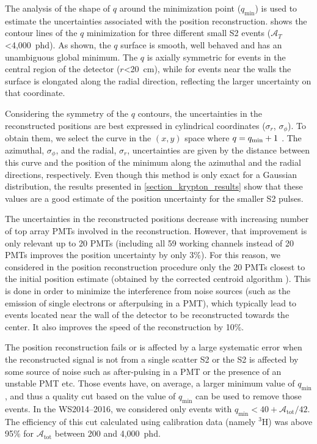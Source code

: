 \documentclass[a4paper,11pt]{article}
\begin{document}
The analysis of the shape of $q$ around the minimization point (${q}_{\mathrm{min}}$) is used to estimate the uncertainties associated with the position reconstruction.  shows the contour lines of the $q$ minimization for three different small S2 events ($\mathcal{A}_T$<4,000~phd). As shown, the $q$ surface is smooth, well behaved and has an unambiguous global minimum. The $q$ is axially symmetric for events in the central region of the detector ($r$<20~cm), while for events near the walls the surface is elongated along the radial direction, reflecting the larger uncertainty on that coordinate.

Considering the symmetry of the $q$ contours, the  uncertainties in the reconstructed positions are best expressed in cylindrical coordinates ($\sigma_r$, $\sigma_\phi$). To obtain them, we select the curve in the $(x, y)$ space where  $q = q_{\rm min} + 1$ \cite{PDG2014}. The azimuthal, $\sigma_\phi$, and the radial, $\sigma_r$, uncertainties are given by the distance between this curve and the position of the minimum along the azimuthal and the radial directions, respectively. Even though this method is only exact for a Gaussian distribution, the results presented in \cref{section_krypton_results} show that these values are a good estimate of the position uncertainty for the smaller S2 pulses.

The uncertainties in the reconstructed positions decrease with increasing number of top array PMTs involved in the reconstruction. However, that improvement is only relevant up to 20 PMTs (including all 59 working channels instead of 20 PMTs improves the position uncertainty by only 3\%). For this reason, we considered in the position reconstruction procedure only the 20 PMTs closest to the initial position estimate (obtained by the corrected centroid algorithm \cite{Solovov2011_PositionReconstruction}). This is done in order to minimize the interference from noise sources (such as the emission of single electrons or afterpulsing in a PMT), which typically lead to events located near the wall of the detector to be reconstructed towards the center. It also improves the speed of the reconstruction by 10\%.

The position reconstruction fails or is affected by a large systematic error when the reconstructed signal is not from a single scatter S2 or the S2 is affected by some source of noise such as  after-pulsing in a PMT or the presence of an unstable PMT etc. Those events have, on average, a larger minimum value of ${q}_{\mathrm{min}}$, and thus a quality cut based on the value of ${q}_{\mathrm{min}}$ can be used to remove those events. In the WS2014--2016, we considered only events with ${q}_{\mathrm{min}}<40+\mathcal{A}_{\mathrm{tot}}/42$. The efficiency of this cut calculated using calibration data (namely ${}^{3}$H) was above 95\% \cite{LUX2016_SSR} for $\mathcal{A}_{\mathrm{tot}}$ between 200 and 4,000~phd.
\end{document}
